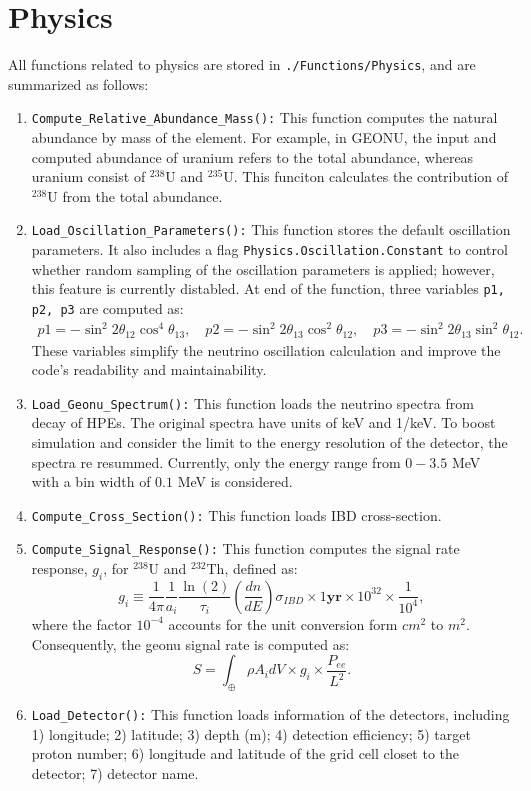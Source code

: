 		\section{Physics}
			All functions related to physics are stored in \texttt{./Functions/Physics}, and are summarized as follows:
				\begin{enumerate}
					\item \texttt{Compute\_Relative\_Abundance\_Mass():} This function computes the natural abundance by mass of the element. For example, in GEONU, the input and computed abundance of uranium refers to the total abundance, whereas uranium consist of ${}^{238}$U and ${}^{235}$U. This funciton calculates the contribution of ${}^{238}$U from the total abundance.
					\item \texttt{Load\_Oscillation\_Parameters():} This function stores the default oscillation parameters. It also includes a flag \texttt{Physics.Oscillation.Constant} to control whether random sampling of the oscillation parameters is applied; however, this feature is currently distabled. At end of the function, three variables \texttt{p1, p2, p3} are computed as:
						\begin{align}
							p1 = -\sin^2 2\theta_{12} \cos^4 \theta_{13},
							\quad
							p2 = -\sin^2 2\theta_{13} \cos^2 \theta_{12},
							\quad
							p3 = - \sin^2 2\theta_{13} \sin^2 \theta_{12}.
						\end{align}
					These variables simplify the neutrino oscillation calculation and improve the code's readability and maintainability.
					\item \texttt{Load\_Geonu\_Spectrum():} This function loads the neutrino spectra from decay of HPEs. The original spectra have units of keV and 1/keV. To boost  simulation and consider the limit to the energy resolution of the detector, the spectra re resummed. Currently, only the energy range from $0-3.5$ MeV with a bin width of $0.1$ MeV is considered.
					\item \texttt{Compute\_Cross\_Section():} This function loads IBD cross-section.
					\item \texttt{Compute\_Signal\_Response():} This function computes the signal rate response, $g_i$, for ${}^{238}$U and ${}^{232}$Th, defined as:
						\begin{equation}
							g_i
							\equiv \frac{1}{4\pi}\frac{1}{a_i} \frac{\ln(2)}{\tau_i} \left(\frac{dn}{dE}\right) \sigma_{IBD} \times 1 \textbf{yr} \times 10^{32} \times \frac{1}{10^4},
						\end{equation}
					where the factor $10^{-4}$ accounts for the unit conversion form $cm^2$ to $m^2$. Consequently, the geonu signal rate is computed as:
						\begin{equation}
							S
							= \int_{\oplus} \rho A_i dV \times g_i \times \frac{P_{ee}}{L^2}.
						\end{equation}
					\item \texttt{Load\_Detector():} This function loads information of the detectors, including 1) longitude; 2) latitude; 3) depth (m); 4) detection efficiency; 5) target proton number; 6) longitude and latitude of the grid cell closet to the detector; 7) detector name.
				\end{enumerate}
